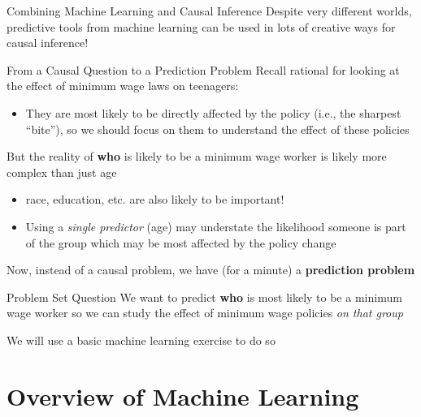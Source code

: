 \documentclass[
  ignorenonframetext,
]{beamer}
\providecommand{\tightlist}{%
  \setlength{\itemsep}{0pt}\setlength{\parskip}{0pt}}
\begin{document}
\begin{frame}{Combining Machine Learning and Causal Inference}
\label{combining-machine-learning-and-causal-inference}
Despite very different worlds, predictive tools from machine learning
can be used in lots of creative ways for causal inference!
\end{frame}

\begin{frame}{From a Causal Question to a Prediction Problem}
\label{from-a-causal-question-to-a-prediction-problem}
Recall rational for looking at the effect of minimum wage laws on
teenagers:

\begin{itemize}
\tightlist
\item
  They are most likely to be directly affected by the policy (i.e., the
  sharpest ``bite''), so we should focus on them to understand the
  effect of these policies
\end{itemize}

But the reality of \textbf{who} is likely to be a minimum wage worker is
likely more complex than just age

\begin{itemize}
\tightlist
\item
  race, education, etc. are also likely to be important!
\item
  Using a \emph{single predictor} (age) may understate the likelihood
  someone is part of the group which may be most affected by the policy
  change
\end{itemize}

Now, instead of a causal problem, we have (for a minute) a
\textbf{prediction problem}
\end{frame}

\begin{frame}{Problem Set Question}
\label{problem-set-question}
We want to predict \textbf{who} is most likely to be a minimum wage
worker so we can study the effect of minimum wage policies \emph{on that
group}

We will use a basic machine learning exercise to do so
\end{frame}

\section{Overview of Machine
Learning}\label{overview-of-machine-learning}
\end{document}
